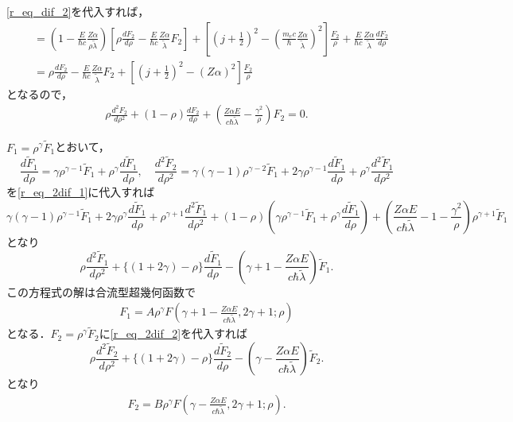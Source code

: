 \eqref{r_eq_dif_2}を代入すれば，
\begin{align*}
  &=\left(1 - \frac{E}{\hbar c}\frac{Z\alpha}{\rho\tilde{\lambda}}\right)\left[\rho\frac{dF_2}{d\rho} - \frac{E}{\hbar c}\frac{Z\alpha}{\tilde{\lambda}}F_2\right] + \left[\left(j + \frac{1}{2}\right)^2 - \left(\frac{m_ec}{\hbar}\frac{Z\alpha}{\tilde{\lambda}}\right)^2\right]\frac{F_2}{\rho} + \frac{E}{\hbar c}\frac{Z\alpha}{\tilde{\lambda}}\frac{dF_2}{d\rho}\\
  &=\rho\frac{dF_2}{d\rho} - \frac{E}{\hbar c}\frac{Z\alpha}{\tilde{\lambda}}F_2 + \left[\left(j + \frac{1}{2}\right)^2 - (Z\alpha)^2\right]\frac{F_2}{\rho}
\end{align*}
となるので，
\begin{align}
  \rho\frac{d^2F_2}{d\rho^2} + (1 - \rho)\frac{dF_2}{d\rho} + \left(\frac{Z\alpha E}{c\hbar\tilde{\lambda}} - \frac{\gamma^2}{\rho}\right)F_2=0.\label{r_eq_2dif_2}
\end{align}

$F_1=\rho^\gamma\tilde{F}_1$とおいて，
\[\frac{d\tilde{F}_1}{d\rho}=\gamma\rho^{\gamma - 1}\tilde{F}_1 + \rho^\gamma\frac{d\tilde{F}_1}{d\rho},\quad\frac{d^2\tilde{F}_2}{d\rho^2}=\gamma(\gamma - 1)\rho^{\gamma - 2}\tilde{F}_1 + 2\gamma\rho^{\gamma - 1}\frac{d\tilde{F}_1}{d\rho} + \rho^\gamma\frac{d^2\tilde{F}_1}{d\rho^2}\]
を\eqref{r_eq_2dif_1}に代入すれば
\[\gamma(\gamma - 1)\rho^{\gamma - 1}\tilde{F}_1 + 2\gamma\rho^\gamma\frac{d\tilde{F}_1}{d\rho} + \rho^{\gamma + 1}\frac{d^2\tilde{F}_1}{d\rho^2} + (1 - \rho)\left(\gamma\rho^{\gamma - 1}\tilde{F}_1 + \rho^\gamma\frac{d\tilde{F}_1}{d\rho}\right) + \left(\frac{Z\alpha E}{c\hbar\tilde{\lambda}} - 1 - \frac{\gamma^2}{\rho}\right)\rho^{\gamma + 1}\tilde{F}_1\]
となり
\[\rho\frac{d^2\tilde{F}_1}{d\rho^2} + \{(1 + 2\gamma) - \rho\}\frac{d\tilde{F}_1}{d\rho} - \left(\gamma + 1 - \frac{Z\alpha E}{c\hbar\tilde{\lambda}}\right)\tilde{F}_1.\]
この方程式の解は合流型超幾何函数で
\begin{align}
  F_1=A\rho^\gamma F\left(\gamma + 1 - \frac{Z\alpha E}{c\hbar\tilde{\lambda}}, 2\gamma + 1; \rho\right)\label{F_1_CHGF}
\end{align}
となる．$F_2=\rho^\gamma\tilde{F}_2$に\eqref{r_eq_2dif_2}を代入すれば
\[\rho\frac{d^2\tilde{F}_2}{d\rho^2} + \{(1 + 2\gamma) - \rho\}\frac{d\tilde{F}_2}{d\rho} - \left(\gamma - \frac{Z\alpha E}{c\hbar\tilde{\lambda}}\right)\tilde{F}_2.\]
となり
\begin{align}
  F_2=B\rho^\gamma F\left(\gamma - \frac{Z\alpha E}{c\hbar\tilde{\lambda}}, 2\gamma + 1; \rho\right).\label{F_2_CHGF}
\end{align}

